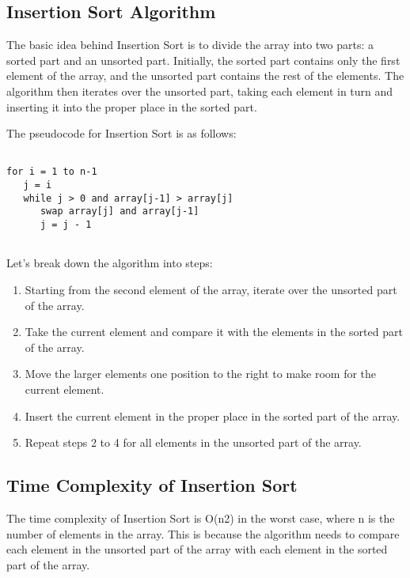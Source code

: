 \documentclass[a4paper, 11pt, oneside]{book} %
\begin{document}
\subsection{Insertion Sort Algorithm}

The basic idea behind Insertion Sort is to divide the array into two parts: a sorted part and an unsorted part. Initially, the sorted part contains only the first element of the array, and the unsorted part contains the rest of the elements. The algorithm then iterates over the unsorted part, taking each element in turn and inserting it into the proper place in the sorted part.

\vspace{0.75\baselineskip} %

The pseudocode for Insertion Sort is as follows:

\begin{verbatim}

for i = 1 to n-1
   j = i
   while j > 0 and array[j-1] > array[j]
      swap array[j] and array[j-1]
      j = j - 1
      
\end{verbatim}


Let's break down the algorithm into steps:

\begin{enumerate}
  \item Starting from the second element of the array, iterate over the unsorted part of the array.
  \item Take the current element and compare it with the elements in the sorted part of the array.
  \item Move the larger elements one position to the right to make room for the current element.
  \item Insert the current element in the proper place in the sorted part of the array.
  \item Repeat steps 2 to 4 for all elements in the unsorted part of the array.
\end{enumerate}


\subsection{Time Complexity of Insertion Sort}

The time complexity of Insertion Sort is O(n2) in the worst case, where n is the number of elements in the array. This is because the algorithm needs to compare each element in the unsorted part of the array with each element in the sorted part of the array.
\end{document}
